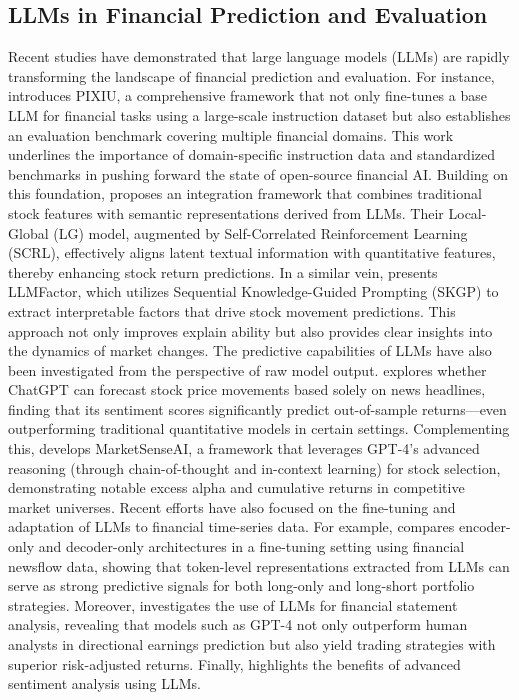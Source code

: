 \subsection{LLMs in Financial Prediction and Evaluation}
Recent studies have demonstrated that large language models (LLMs) are rapidly transforming the landscape of financial prediction and evaluation. For instance, \cite{xie2023pixiulargelanguagemodel} introduces PIXIU, a comprehensive framework that not only fine-tunes a base LLM for financial tasks using a large-scale instruction dataset but also establishes an evaluation benchmark covering multiple financial domains. This work underlines the importance of domain-specific instruction data and standardized benchmarks in pushing forward the state of open-source financial AI. Building on this foundation, \cite{ding2023integratingstockfeaturesglobal} proposes an integration framework that combines traditional stock features with semantic representations derived from LLMs. Their Local-Global (LG) model, augmented by Self-Correlated Reinforcement Learning (SCRL), effectively aligns latent textual information with quantitative features, thereby enhancing stock return predictions. In a similar vein, \cite{wang2024llmfactorextractingprofitablefactors} presents LLMFactor, which utilizes Sequential Knowledge-Guided Prompting (SKGP) to extract interpretable factors that drive stock movement predictions. This approach not only improves explain ability but also provides clear insights into the dynamics of market changes. The predictive capabilities of LLMs have also been investigated from the perspective of raw model output. \cite{lopezlira2024chatgptforecaststockprice} explores whether ChatGPT can forecast stock price movements based solely on news headlines, finding that its sentiment scores significantly predict out-of-sample returns—even outperforming traditional quantitative models in certain settings. Complementing this, \cite{Fatouros_2024} develops MarketSenseAI, a framework that leverages GPT-4’s advanced reasoning (through chain-of-thought and in-context learning) for stock selection, demonstrating notable excess alpha and cumulative returns in competitive market universes. Recent efforts have also focused on the fine-tuning and adaptation of LLMs to financial time-series data. For example, \cite{guo2024finetuninglargelanguagemodels} compares encoder-only and decoder-only architectures in a fine-tuning setting using financial newsflow data, showing that token-level representations extracted from LLMs can serve as strong predictive signals for both long-only and long-short portfolio strategies. Moreover, \cite{kim2024financialstatementanalysislarge} investigates the use of LLMs for financial statement analysis, revealing that models such as GPT-4 not only outperform human analysts in directional earnings prediction but also yield trading strategies with superior risk-adjusted returns. Finally, \cite{Kirtac_2024} highlights the benefits of advanced sentiment analysis using LLMs. 

